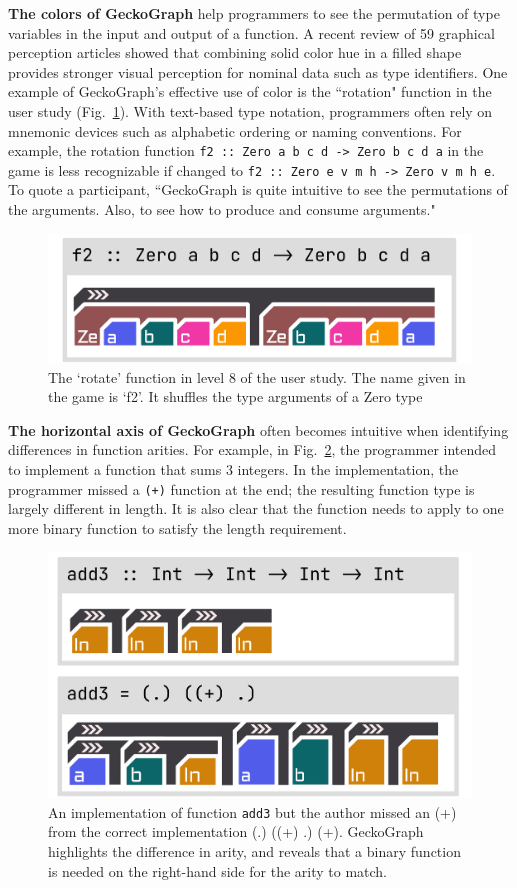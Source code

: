 \textbf{The colors of GeckoGraph} help programmers to see the permutation of type variables in the input and output of a function. A recent review \cite{Zeng2023-jz} of 59 graphical perception articles showed that combining solid color hue in a filled shape provides stronger visual perception for nominal data such as type identifiers. One example of GeckoGraph's effective use of color is the ``rotation" function in the user study (Fig.~\ref{fig:rotate}). With text-based type notation, programmers often rely on mnemonic devices such as alphabetic ordering or naming conventions. For example, the rotation function \texttt{f2 :: Zero a b c d -> Zero b c d a} in the game is less recognizable if changed to \texttt{f2 :: Zero e v m h -> Zero v m h e}. To quote a participant, ``GeckoGraph is quite intuitive to see the permutations of the arguments. Also, to see how to produce and consume arguments." 

\begin{figure}[hbt]
  \includegraphics[width=0.6\linewidth]{figures/rotate}
  \caption[The `rotate' function in level 8 of the user study depicted in GeckoGraph]{\label{fig:rotate} The `rotate' function in level 8 of the user study. The name given in the game is `f2'. It shuffles the type arguments of a Zero type}
\end{figure}


\textbf{The horizontal axis of GeckoGraph} often becomes intuitive when identifying differences in function arities. For example, in Fig.~\ref{fig:add3}, the programmer intended to implement a function that sums 3 integers. In the implementation, the programmer missed a \texttt{(+)} function at the end; the resulting function type is largely different in length. It is also clear that the function needs to apply to one more binary function to satisfy the length requirement.  

\begin{figure}[hbt]
  \includegraphics[width=0.6\linewidth]{figures/Add3}
  \caption[An implementation of function \texttt{add3} depicted in GeckoGraph]{\label{fig:add3} An implementation of function \texttt{add3} but the author missed an (+) from the correct implementation (.) ((+) .) (+). GeckoGraph highlights the difference in arity, and reveals that a binary function is needed on the right-hand side for the arity to match. }
\end{figure}


